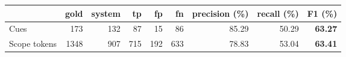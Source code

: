 \begin{tabular}{lrrrrrrrr}
    \toprule
    {}           & gold & system &  tp &  fp &  fn & precision (\%) & recall (\%) & F1 (\%) \\
    \midrule
    Cues         &  173 &    132 &  87 &  15 &  86 &          85.29 &       50.29 &   \textbf{63.27} \\
    Scope tokens & 1348 &    907 & 715 & 192 & 633 &          78.83 &       53.04 &   \textbf{63.41} \\
    \bottomrule
\end{tabular}